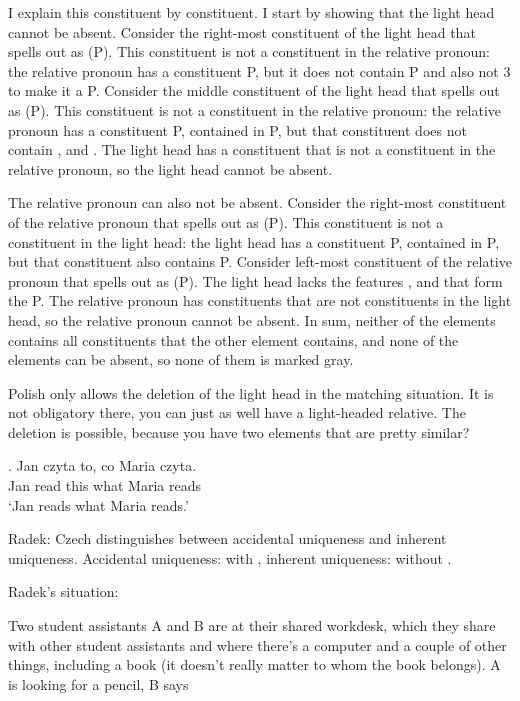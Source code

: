 I explain this constituent by constituent.
I start by showing that the light head cannot be absent.
Consider the right-most constituent of the light head that spells out as  (P). This constituent is not a constituent in the relative pronoun: the relative pronoun has a constituent P, but it does not contain P and also not 3 to make it a P.
Consider the middle constituent of the light head that spells out as  (P). This constituent is not a constituent in the relative pronoun: the relative pronoun has a constituent P, contained in P, but that constituent does not contain ,  and .
The light head has a constituent that is not a constituent in the relative pronoun, so the light head cannot be absent.

The relative pronoun can also not be absent.
Consider the right-most constituent of the relative pronoun that spells out as  (P). This constituent is not a constituent in the light head: the light head has a constituent P, contained in P, but that constituent also contains P.
Consider left-most constituent of the relative pronoun that spells out as  (P). The light head lacks the features ,  and  that form the P.
The relative pronoun has constituents that are not constituents in the light head, so the relative pronoun cannot be absent.
In sum, neither of the elements contains all constituents that the other element contains, and none of the elements can be absent, so none of them is marked gray.


Polish only allows the deletion of the light head in the matching situation. It is not obligatory there, you can just as well have a light-headed relative. The deletion is possible, because you have two elements that are pretty similar?

\exg. Jan czyta to, co Maria czyta.\\
 Jan read this what Maria reads\\
 `Jan reads what Maria reads.' 


Radek: Czech distinguishes between accidental uniqueness and inherent uniqueness. Accidental uniqueness: with , inherent uniqueness: without .

Radek's situation:

Two student assistants A and B are at their shared workdesk, which they share with other student assistants and where there’s a computer and a couple of other things, including a book (it doesn’t really matter to whom the book belongs). A is looking for a pencil, B says

